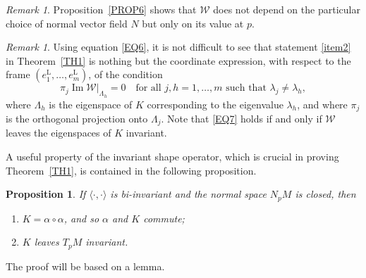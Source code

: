 \documentclass[a4paper,12pt,oneside]{amsart}
\DeclareMathOperator{\Ima}{Im}
\theoremstyle{plain}
\newtheorem{proposition}[theorem]{Proposition}
\theoremstyle{remark}
\newtheorem{remark}[theorem]{Remark}
\theoremstyle{definition}
\begin{document}
\begin{remark}
Proposition~\ref{PROP6} shows that $\mathcal{W}$ does not depend on the particular choice of normal vector field $N$ but only on its value at $p$.
\end{remark}

\begin{remark}
Using equation \eqref{EQ6}, it is not difficult to see that statement \ref{item2} in Theorem~\ref{TH1} is nothing but the coordinate expression, with respect to the frame $(e^{\mathrm{L}}_{1}, \dotsc, e^{\mathrm{L}}_{m})$, of the condition
\begin{equation} \label{EQ7}
\pi_{j} \Ima \mathcal{W} \rvert_{\Lambda_{h}} = 0 \quad \text{for all $j,h = 1, \dotsc, m$ such that $\lambda_{j} \neq \lambda_{h}$},
\end{equation}
where $\Lambda_{h}$ is the eigenspace of $K$ corresponding to the eigenvalue $\lambda_{h}$, and where $\pi_{j}$ is the orthogonal projection onto $\Lambda_{j}$. Note that \eqref{EQ7} holds if and only if $\mathcal{W}$ leaves the eigenspaces of $K$ invariant.
\end{remark}
%

A useful property of the invariant shape operator, which is crucial in proving Theorem~\ref{TH1}, is contained in the following proposition.

\begin{proposition}\label{PROP9}
If $\langle \cdot{,} \cdot \rangle$ is bi-invariant and the normal space $N_{p}M$ is closed, then
\begin{enumerate}[font=\upshape]
\item $K=\alpha\circ\alpha$, and so $\alpha$ and $K$ commute;
\item $K$ leaves $T_{p}M$ invariant.
\end{enumerate}
\end{proposition}

The proof will be based on a lemma.
\end{document}
